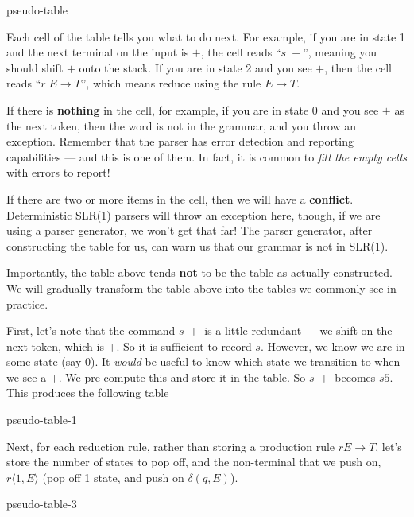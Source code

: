 \begin{center}
    {pseudo-table}
\end{center}

Each cell of the table tells you what to do next. For example, if you are in state 1 and the next terminal on the input is $+$, the cell reads ``$s\;+$'', meaning you should shift $+$ onto the stack. If you are in state 2 and you see $+$, then the cell reads ``$r \; E \to T$'', which means reduce using the rule $E \to T$. 

If there is \textbf{nothing} in the cell, for example, if you are in state 0 and you see $+$ as the next token, then the word is not in the grammar, and you throw an exception. Remember that the parser has error detection and reporting capabilities --- and this is one of them. In fact, it is common to \textit{fill the empty cells} with errors to report!

If there are two or more items in the cell, then we will have a \textbf{conflict}. Deterministic SLR(1) parsers will throw an exception here, though, if we are using a parser generator, we won't get that far! The parser generator, after constructing the table for us, can warn us that our grammar is not in SLR(1).

Importantly, the table above tends \textbf{not} to be the table as actually constructed. We will gradually transform the table above into the tables we commonly see in practice.

First, let's note that the command $s \; +$ is a little redundant --- we shift on the next token, which is $+$. So it is sufficient to record $s$. However, we know we are in some state (say $0$). It \textit{would} be useful to know which state we transition to when we see a $+$. We pre-compute this and store it in the table. So $s \; +$ becomes $s5$. This produces the following table

\begin{center}
    {pseudo-table-1}
\end{center}

Next, for each reduction rule, rather than storing a production rule $r E \to T$, let's store the number of states to pop off, and the non-terminal that we push on, $r \langle 1, E \rangle$ (pop off 1 state, and push on $\delta(q, E)$). 

\begin{center}
    {pseudo-table-3}
\end{center}

